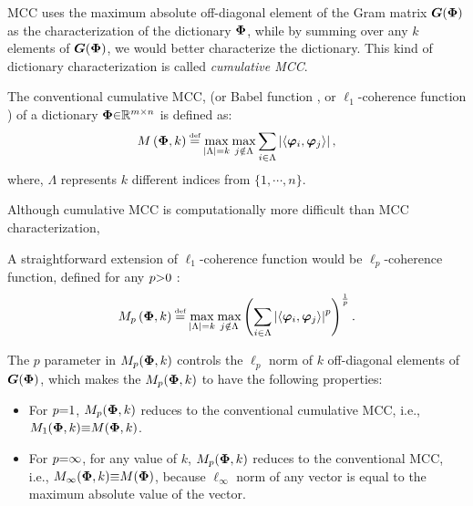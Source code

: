 MCC uses the maximum absolute off-diagonal element of the Gram matrix $\boldsymbol{G}(\boldsymbol{\Phi})$ as the characterization of the dictionary $\boldsymbol{\Phi}$, while by summing over any $k$ elements of $\boldsymbol{G}(\boldsymbol{\Phi})$, we would better characterize the dictionary. 
This kind of dictionary characterization is called \emph{cumulative MCC}.

The conventional cumulative MCC, (or Babel function \cite{Tropp2004}, or $\ell_1$-coherence function \cite{Foucart2013}) of a dictionary $\boldsymbol{\Phi} {\in} \mathbb{R}^{m {\times} n}$ is defined as:
\begin{equation}
\label{eq:CMIC}
M\myparanthese{\myPhi , k} \myeq 
\max_{\myabs{\Lambda}=k} \max_{j \notin \Lambda}
\sum_{i \in \Lambda} \myabs{ \left\langle \boldsymbol{\varphi}_i , \boldsymbol{\varphi}_{j} \right\rangle},
\end{equation}
where, $\Lambda$ represents $k$ different indices from $\{1, \cdots, n\}$.

Although cumulative MCC is computationally more difficult than MCC characterization, 

A straightforward extension of $\ell_1$-coherence function would be $\ell_p$-coherence function, defined for any $p {>} 0$ \cite{Foucart2013}:
\begin{equation*}
M_p\myparanthese{\myPhi , k} \myeq 
\max_{\myabs{\Lambda}=k} \max_{j \notin \Lambda}
\myparanthese{\sum_{i \in \Lambda} \myabs{ \left\langle \boldsymbol{\varphi}_i , \boldsymbol{\varphi}_{j} \right\rangle}^p } ^ {\frac1p}.
\end{equation*}

The $p$ parameter in $M_p(\boldsymbol{\Phi} , k)$ controls the $\ell_p$ norm of $k$ off-diagonal elements of $\boldsymbol{G}(\boldsymbol{\Phi})$, which makes the $M_p(\boldsymbol{\Phi} , k)$ to have the following properties:
\begin{itemize}
\item For $p {=} 1$, $M_p(\boldsymbol{\Phi} , k)$ reduces to the conventional cumulative MCC, i.e., $M_1(\boldsymbol{\Phi} , k) {\equiv} M(\boldsymbol{\Phi} , k)$.
\item For $p {=} \infty$, for any value of $k$, $M_p(\boldsymbol{\Phi} , k)$ reduces to the conventional MCC, i.e., $M_{\infty}(\boldsymbol{\Phi} , k) {\equiv} M(\boldsymbol{\Phi})$, because $\ell_{\infty}$ norm of any vector is equal to the maximum absolute value of the vector.
\end{itemize}

